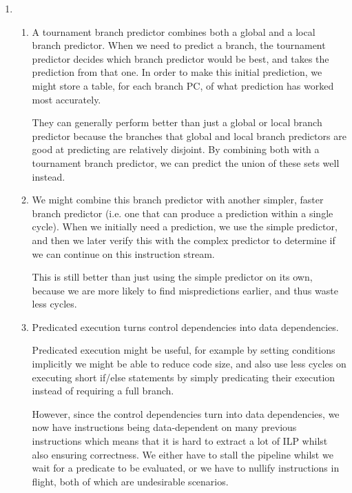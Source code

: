 \begin{enumerate}[label=(\alph*)]
\begin{enumerate}[label=(\roman*)]
        
    \end{enumerate}

    \item
      \begin{enumerate}[label=(\roman*)]

        \item
          A tournament branch predictor combines both a global and a local branch predictor. When we need to predict a branch, the tournament predictor decides which branch predictor would be best, and takes the prediction from that one. In order to make this initial prediction, we might store a table, for each branch PC, of what prediction has worked most accurately.

          They can generally perform better than just a global or local branch predictor because the branches that global and local branch predictors are good at predicting are relatively disjoint. By combining both with a tournament branch predictor, we can predict the union of these sets well instead.

          \item
            We might combine this branch predictor with another simpler, faster branch predictor (i.e. one that can produce a prediction within a single cycle). When we initially need a prediction, we use the simple predictor, and then we later verify this with the complex predictor to determine if we can continue on this instruction stream.

            This is still better than just using the simple predictor on its own, because we are more likely to find mispredictions earlier, and thus waste less cycles.

            \item
              Predicated execution turns control dependencies into data dependencies.

              Predicated execution might be useful, for example by setting conditions implicitly we might be able to reduce code size, and also use less cycles on executing short if/else statements by simply predicating their execution instead of requiring a full branch.

              However, since the control dependencies turn into data dependencies, we now have instructions being data-dependent on many previous instructions which means that it is hard to extract a lot of ILP whilst also ensuring correctness. We either have to stall the pipeline whilst we wait for a predicate to be evaluated, or we have to nullify instructions in flight, both of which are undesirable scenarios.
          
      \end{enumerate}
    
\end{enumerate}
  

